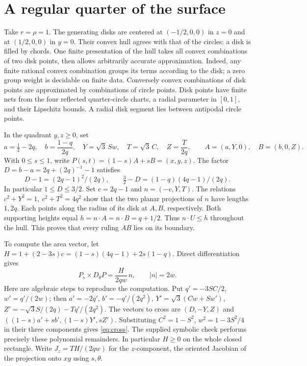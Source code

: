 \documentclass[11pt,letterpaper]{article}
\newcommand{\sect}[1]{\section[#1]{\color{ink}#1}}
\newcommand{\Dth}{D_{\theta}}
\begin{document}
\sect{A regular quarter of the surface}\label{sec:chart}
Take \(r=\rho=1\). The generating disks are centered at \((-1/2,0,0)\) in \(z=0\) and at \((1/2,0,0)\) in \(y=0\). Their convex hull agrees with that of the circles: a disk is filled by chords. One finite presentation of the hull takes all convex combinations of two disk points, then allows arbitrarily accurate approximation. Indeed, any finite rational convex combination groups its terms according to the disk; a zero group weight is decidable on finite data. Conversely convex combinations of disk points are approximated by combinations of circle points. Disk points have finite nets from the four reflected quarter-circle charts, a radial parameter in \([0,1]\), and their Lipschitz bounds. A radial disk segment lies between antipodal circle points.

\newpage
In the quadrant \(y,z\ge0\), set
\[
 a=\tfrac12-2q,\quad b=\frac{1-q}{2q},\quad
 Y=\sqrt3\,S w,\quad T=\sqrt3\,C,\quad Z=\frac{T}{2q},
 \qquad A=(a,Y,0),\quad B=(b,0,Z).
\]
With \(0\le s\le1\), write \(P(s,t)=(1-s)A+sB=(x,y,z)\). The factor \(D=b-a=2q+(2q)^{-1}-1\) satisfies
\[
 D-1=(2q-1)^2/(2q),\qquad \tfrac32-D=(1-q)(4q-1)/(2q).
\]
In particular \(1\le D\le 3/2\). Set \(c=2q-1\) and \(n=(-c,Y,T)\).
The relations \(c^2+Y^2=1,\ c^2+T^2=4q^2\) show that the two planar projections of \(n\) have lengths \(1,2q\). Each points along the radius of its disk at \(A,B\), respectively. Both supporting heights equal \(h=n\cdot A=n\cdot B=q+1/2\). Thus \(n\cdot U\le h\) throughout the hull. This proves that every ruling \(AB\) lies on its boundary.

To compute the area vector, let \(H=1+(2-3s)c=(1-s)(4q-1)+2s(1-q)\). Direct differentiation gives
\begin{equation}
 P_s\times\Dth P=\frac{H}{2qw}\,n,\qquad |n|=2w . \label{eq:cross}
\end{equation}
Here are algebraic steps to reproduce the computation. Put \(q'=-3SC/2\), \(w'=q'/(2w)\); then \(a'=-2q'\), \(b'=-q'/(2q^2)\), \(Y'=\sqrt3(Cw+Sw')\), \(Z'=-\sqrt3 S/(2q)-Tq'/(2q^2)\). The vectors to cross are \((D,-Y,Z)\) and \(((1-s)a'+sb',(1-s)Y',sZ')\). Substituting \(C^2=1-S^2\), \(w^2=1-3S^2/4\) in their three components gives \eqref{eq:cross}. The supplied symbolic check performs precisely these polynomial remainders. In particular \(H\ge0\) on the whole closed rectangle. Write \(J_z=TH/(2qw)\) for the \(z\)-component, the oriented Jacobian of the projection onto \(xy\) using \(s,\theta\).
\end{document}

